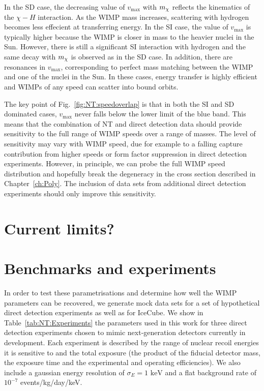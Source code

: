 In the SD case, the decreasing value of $v_\textrm{max}$ with $\mchi$ reflects the kinematics of the $\chi-H$ interaction. As the WIMP mass increases, scattering with hydrogen becomes less effecient at transferring energy. In the SI case, the value of $v_\textrm{max}$ is typically higher because the WIMP is closer in mass to the heavier nuclei in the Sun. However, there is still a significant SI interaction with hydrogen and the same decay with $\mchi$ is observed as in the SD case. In addition, there are resonances in $v_\textrm{max}$, corresponding to perfect mass matching between the WIMP and one of the nuclei in the Sun. In these cases, energy transfer is highly efficient and WIMPs of any speed can scatter into bound orbits.

The key point of Fig.~\ref{fig:NT:speedoverlap} is that in both the SI and SD dominated cases, $v_\textrm{max}$ never falls below the lower limit of the blue band. This means that the combination of NT and direct detection data should provide sensitivity to the full range of WIMP speeds over a range of masses. The level of sensitivity may vary with WIMP speed, due for example to a falling capture contribution from higher speeds or form factor suppression in direct detection experiments. However, in principle, we can probe the full WIMP speed distribution and hopefully break the degeneracy in the cross section described in Chapter~\ref{ch:Poly}. The inclusion of data sets from additional direct detection experiments should only improve this sensitivity.




\section{Current limits?}

\section{Benchmarks and experiments}
\label{sec:NT:experiments}
In order to test these parametrisations and determine how well the WIMP parameters can be recovered, we generate mock data sets for a set of hypothetical direct detection experiments as well as for IceCube. We show in Table~\ref{tab:NT:Experiments} the parameters used in this work for three direct detection experiments chosen to mimic next-generation detectors currently in development. Each experiment is described by the range of nuclear recoil energies it is sensitive to and the total exposure (the product of the fiducial detector mass, the exposure time and the experimental and operating efficiencies). We also include a gaussian energy resolution of $\sigma_E = 1 \textrm{ keV}$ and a flat background rate of $10^{-7}$ events/kg/day/keV.


